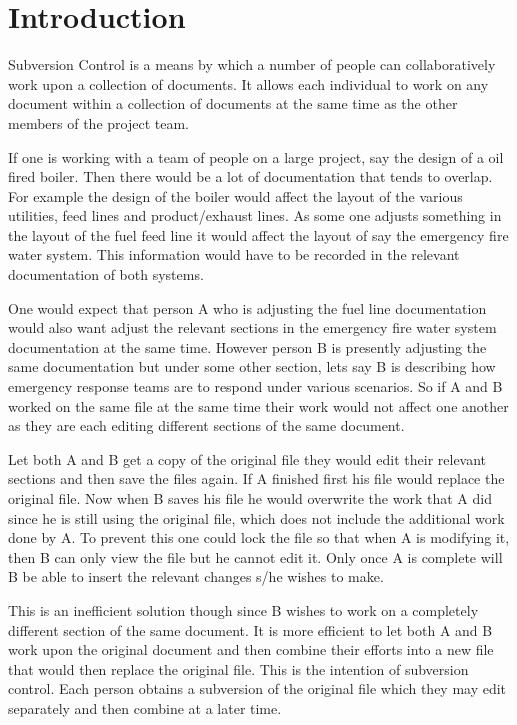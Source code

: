 \section{Introduction}

Subversion Control is a means by which a number of people can collaboratively work upon a collection of documents. It allows each individual to work on any document within a collection of documents at the same time as the other members of the project team. 

If one is working with a team of people on a large project, say the design of a oil fired boiler. Then there would be a lot of documentation that tends to overlap. For example the design of the boiler would affect the layout of the various utilities, feed lines and product/exhaust lines. As some one adjusts something in the layout of the fuel feed line it would affect the layout of say the emergency fire water system. This information would have to be recorded in the relevant documentation of both systems.

One would expect that person A who is adjusting the fuel line documentation would also want adjust the relevant sections in the emergency fire water system documentation at the same time. However person B is presently adjusting the same documentation but under some other section, lets say B is describing how emergency response teams are to respond under various scenarios. So if A and B worked on the same file at the same time their work would not affect one another as they are each editing different sections of the same document. 

Let both A and B get a copy of the original file they would edit their relevant sections and then save the files again. If A finished first his file would replace the original file. Now when B saves his file he would overwrite the work that A did since he is still using the original file, which does not include the additional work done by A. To prevent this one could lock the file so that when A is modifying it, then B can only view the file but he cannot edit it. Only once A is complete will B be able to insert the relevant changes s/he wishes to make.

This is an inefficient solution though since B wishes to work on a completely different section of the same document. It is more efficient to let both A and B work upon the original document and then combine their efforts into a new file that would then replace the original file. This is the intention of subversion control. Each person obtains a subversion of the original file which they may edit separately and then combine at a later time.

